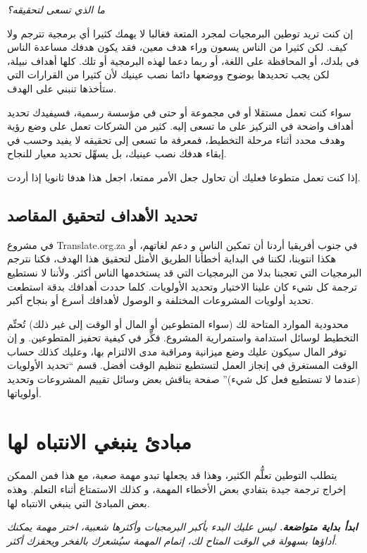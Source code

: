 {\it
ما الذي تسعى لتحقيقه؟}

إن كنت تريد توطين البرمجيات لمجرد المتعة فغالبا لا يهمك كثيرا أي برمجية
تترجم ولا كيف. لكن كثيرا من الناس يسعون وراء هدف معين، فقد يكون هدفك
مساعدة الناس في بلدك، أو المحافظة على اللغة، أو ربما دعما لهذه البرمجية
أو تلك. كلها أهداف نبيلة، لكن يجب تحديدها بوضوح ووضعها دائما نصب عينيك
لأن كثيرا من القرارات التي ستأخذها تنبني على الهدف.

سواء كنت تعمل مستقلا أو في مجموعة أو حتى في مؤسسة رسمية، فسيفيدك تحديد
أهداف واضحة في التركيز على ما تسعى إليه. كثير من الشركات تعمل على وضع
رؤية وهدف محدد أثناء مرحلة التخطيط، فمعرفة ما تسعى إلى تحقيقه لا يفيد
وحسب في إبقاء هدفك نصب عينيك، بل يسهِّل تحديد معيار للنجاح.

إذا كنت تعمل متطوعا فعليك أن تحاول جعل الأمر ممتعا، اجعل هذا هدفا ثانويا
إذا أردت.

\subsection{تحديد الأهداف لتحقيق المقاصد}
في مشروع Translate.org.za في جنوب أفريقيا أردنا أن تمكين الناس و دعم
لغاتهم، أو هكذا انتوينا، لكننا في البداية أخطأنا الطريق الأمثل لتحقيق
هذا الهدف، فكنا نترجم البرمجيات التي تعجبنا بدلا من البرمجيات التي قد
يستخدمها الناس أكثر. ولأننا لا نستطيع ترجمة كل شيء كان علينا الاختيار
وتحديد الأولويات. كلما حددت أهدافك بدقة استطعت تحديد أولويات المشروعات
المختلفة و الوصول لأهدافك أسرع أو بنجاح أكبر.

محدودية الموارد المتاحة لك (سواء المتطوعين أو المال أو الوقت إلى غير
ذلك) تُحتِّم التخطيط لوسائل استدامة واستمرارية المشروع. فكِّر في كيفية
تحفيز المتطوعين. و إن توفر المال سيكون عليك وضع ميزانية ومراقبة مدى
الالتزام بها، وعليك كذلك حساب الوقت المستغرق في إنجاز العمل لتستطيع
تنظيم الوقت أفضل. قسم “تحديد الأولويات (عندما لا تستطيع فعل كل شيء)”
صفحة \at[ref:36383525] يناقش بعض وسائل تقييم المشروعات وتحديد
أولوياتها.

\section{مبادئ ينبغي الانتباه لها}
يتطلب التوطين تعلُّم الكثير، وهذا قد يجعلها تبدو مهمة صعبة، مع هذا فمن
الممكن إخراج ترجمة جيدة بتفادي بعض الأخطاء المهمة، و كذلك الاستمتاع
أثناء التعلم. وهذه بعض المبادئ التي ينبغي الانتباه لها.

{\it
{\bf ابدأ بداية متواضعة.} ليس عليك البدء بأكبر البرمجيات وأكثرها شعبية،
اختر مهمة يمكنك أداؤها بسهولة في الوقت المتاح لك، إتمام المهمة سيُشعرك
بالفخر ويحفزك أكثر.}

